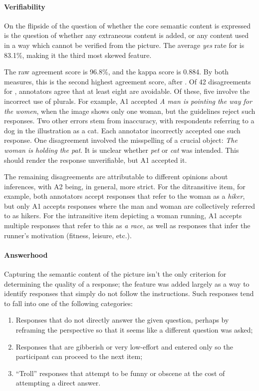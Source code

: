 \paragraph{Verifiability} On the flipside of the question of whether the core semantic content is expressed is the question of whether any extraneous content is added, or any content used in a way which cannot be verified from the picture.  The average \textit{yes} rate for  is 83.1\%, making it the third most skewed feature.

The raw agreement score is 96.8\%, and the kappa score is 0.884. By both measures, this is the second highest agreement score, after . Of 42 disagreements for , annotators agree that at least eight are avoidable. Of these, five involve the incorrect use of plurals. For example, A1 accepted \textit{A man is pointing the way for the women}, when the image shows only one woman, but the guidelines reject such responses. Two other errors stem from inaccuracy, with respondents referring to a dog in the illustration as a cat. Each annotator incorrectly accepted one such response. One disagreement involved the misspelling of a crucial object: \textit{The woman is holding the pat}. It is unclear whether \textit{pet} or \textit{cat} was intended. This should render the response unverifiable, but A1 accepted it.

The remaining disagreements are attributable to different opinions about inferences, with A2 being, in general, more strict.  For the ditransitive item, for example, both annotators accept responses that refer to the woman as a \textit{hiker}, but only A1 accepts responses where the man and woman are collectively referred to as hikers. For the intransitive item depicting a woman running, A1 accepts multiple responses that refer to this as \textit{a race}, as well as responses that infer the runner's motivation (fitness, leisure, etc.).

\paragraph{Answerhood} Capturing the semantic content of the picture isn't the only criterion for determining the quality of a response; the  feature was added largely as a way to identify responses that simply do not follow the instructions. Such responses tend to fall into one of the following categories:

\begin{enumerate}
\item Responses that do not directly answer the given question, perhaps by reframing the perspective so that it seems like a different question was asked;
\item Responses that are gibberish or very low-effort and entered only so the participant can proceed to the next item;
\item ``Troll'' responses that attempt to be funny or obscene at the cost of attempting a direct answer.
\end{enumerate}

